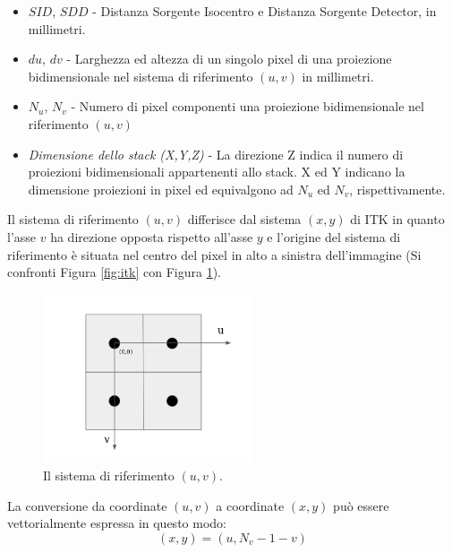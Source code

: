 \documentclass[a4paper,12pt, doubleside]{report}
\begin{document}
                \begin{itemize}
                    \item $SID$, $SDD$ - Distanza Sorgente Isocentro e Distanza Sorgente Detector, in millimetri.
                    
                    \item $du$, $dv$ - Larghezza ed altezza di un singolo pixel di una proiezione bidimensionale nel sistema di riferimento $(u,v)$ in millimetri.
                    
                    \item $N_u$, $N_v$ - Numero di pixel componenti una proiezione bidimensionale nel riferimento $(u,v)$
                    
                    \item \textit{Dimensione dello stack (X,Y,Z)} - La direzione Z indica il numero di proiezioni bidimensionali appartenenti allo stack. X ed Y indicano la dimensione proiezioni in pixel ed equivalgono ad $N_u$ ed $N_v$, rispettivamente.
                \end{itemize}
                    
                Il sistema di riferimento $(u,v)$ differisce dal sistema $(x,y)$ di ITK in quanto l'asse $v$ ha direzione opposta rispetto all'asse $y$ e l'origine del sistema di riferimento è situata nel centro del pixel in alto a sinistra dell'immagine (Si confronti Figura \ref{fig:itk} con Figura \ref{fig:uv}).
                    
                \begin{figure}[h]
                    \centering
                    \includegraphics[width=0.55\textwidth]{uv}
                    \caption{Il sistema di riferimento $(u,v)$.}
                    \label{fig:uv}
                \end{figure}
                
                La conversione da coordinate $(u,v)$ a coordinate $(x,y)$ può essere vettorialmente espressa in questo modo:
                \begin{equation} \label{eq:uv-conversion}
                    (x,y) = ( u, N_v - 1 - v )
                \end{equation}
                    
\end{document}
